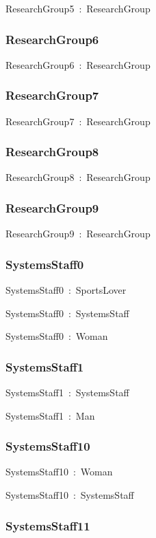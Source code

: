 \documentclass{article}
\begin{document}
ResearchGroup5~:~ResearchGroup

\subsubsection*{ResearchGroup6}

ResearchGroup6~:~ResearchGroup

\subsubsection*{ResearchGroup7}

ResearchGroup7~:~ResearchGroup

\subsubsection*{ResearchGroup8}

ResearchGroup8~:~ResearchGroup

\subsubsection*{ResearchGroup9}

ResearchGroup9~:~ResearchGroup

\subsubsection*{SystemsStaff0}

SystemsStaff0~:~SportsLover

SystemsStaff0~:~SystemsStaff

SystemsStaff0~:~Woman

\subsubsection*{SystemsStaff1}

SystemsStaff1~:~SystemsStaff

SystemsStaff1~:~Man

\subsubsection*{SystemsStaff10}

SystemsStaff10~:~Woman

SystemsStaff10~:~SystemsStaff

\subsubsection*{SystemsStaff11}
\end{document}
